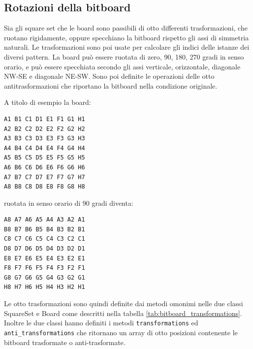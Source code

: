 \subsection{Rotazioni della bitboard}

Sia gli square set che le board sono passibili di otto differenti trasformazioni, che ruotano rigidamente, oppure specchiano la bitboard rispetto gli assi di simmetria
naturali. Le trasformazioni sono poi usate per calcolare gli indici delle istanze dei diversi pattern.
La board può essere ruotata di zero, 90, 180, 270 gradi in senso orario, e può essere specchiata secondo gli assi verticale, orizzontale, diagonale NW-SE e diagonale NE-SW.
Sono poi definite le operazioni delle otto antitrasformazioni che riportano la bitboard nella condizione originale.

A titolo di esempio la board:

{\tiny
\begin{verbatim}
A1 B1 C1 D1 E1 F1 G1 H1
A2 B2 C2 D2 E2 F2 G2 H2
A3 B3 C3 D3 E3 F3 G3 H3
A4 B4 C4 D4 E4 F4 G4 H4
A5 B5 C5 D5 E5 F5 G5 H5
A6 B6 C6 D6 E6 F6 G6 H6
A7 B7 C7 D7 E7 F7 G7 H7
A8 B8 C8 D8 E8 F8 G8 H8
\end{verbatim}
}

ruotata in senso orario di 90 gradi diventa:

{\tiny
\begin{verbatim}
A8 A7 A6 A5 A4 A3 A2 A1
B8 B7 B6 B5 B4 B3 B2 B1
C8 C7 C6 C5 C4 C3 C2 C1
D8 D7 D6 D5 D4 D3 D2 D1
E8 E7 E6 E5 E4 E3 E2 E1
F8 F7 F6 F5 F4 F3 F2 F1
G8 G7 G6 G5 G4 G3 G2 G1
H8 H7 H6 H5 H4 H3 H2 H1
\end{verbatim}
}

Le otto trasformazioni sono quindi definite dai metodi omonimi nelle due classi SquareSet e Board come
descritti nella tabella \ref{tab:bitboard_transformations}.
Inoltre le due classi hanno definiti i metodi \texttt{transformations} ed \texttt{anti\_transformations} che ritornano
un array di otto posizioni contenente le bitboard trasformate o anti-trasformate.

